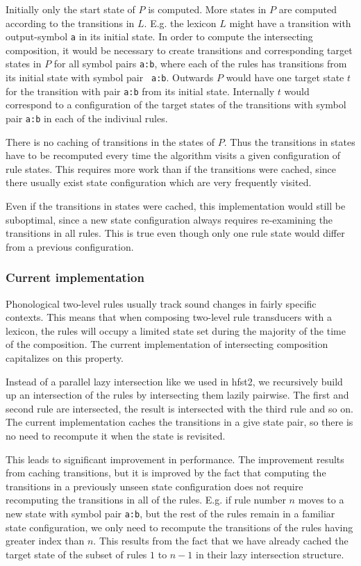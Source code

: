 \documentclass{llncs}
\begin{document}
Initially only the start state of $P$ is computed. More states in $P$
are computed according to the transitions in $L$. E.g. the lexicon $L$
might have a transition with output-symbol {\tt a} in its initial
state. In order to compute the intersecting composition, it would be
necessary to create transitions and corresponding target states in $P$
for all symbol pairs {\tt a:b}, where each of the rules has
transitions from its initial state with symbol pair {\tt
  a:b}. Outwards $P$ would have one target state $t$ for the
transition with pair {\tt a:b} from its initial state. Internally $t$
would correspond to a configuration of the target states of the
transitions with symbol pair {\tt a:b} in each of the indiviual rules.

There is no caching of transitions in the states of $P$. Thus the
transitions in states have to be recomputed every time the algorithm
visits a given configuration of rule states. This requires more work
than if the transitions were cached, since there usually exist state
configuration which are very frequently visited.

Even if the transitions in states were cached, this implementation
would still be suboptimal, since a new state configuration always
requires re-examining the transitions in all rules. This is true even
though only one rule state would differ from a previous configuration.

\subsubsection{Current implementation}

Phonological two-level rules usually track sound changes in fairly
specific contexts. This means that when composing two-level rule
transducers with a lexicon, the rules will occupy a limited state set
during the majority of the time of the composition. The current
implementation of intersecting composition capitalizes on this
property.

Instead of a parallel lazy intersection like we used in hfst2, we
recursively build up an intersection of the rules by intersecting them
lazily pairwise. The first and second rule are intersected, the result
is intersected with the third rule and so on. The current
implementation caches the transitions in a give state pair, so there
is no need to recompute it when the state is revisited.

This leads to significant improvement in performance. The improvement
results from caching transitions, but it is improved by the fact that
computing the transitions in a previously unseen state configuration
does not require recomputing the transitions in all of the
rules. E.g. if rule number $n$ moves to a new state with symbol pair
{\tt a:b}, but the rest of the rules remain in a familiar state
configuration, we only need to recompute the transitions of the rules
having greater index than $n$. This results from the fact that we have
already cached the target state of the subset of rules $1$ to $n-1$ in
their lazy intersection structure.
\end{document}
